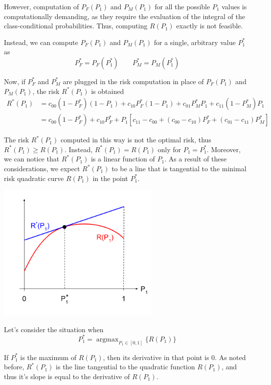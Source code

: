 \documentclass[oneside,onecolumn]{report}
\DeclareMathOperator*{\argmax}{argmax}
\begin{document}
However, computation of $P_F(P_1)$ and $P_M(P_1)$ for all the possible $P_1$ values is computationally demanding, as they require the evaluation of the integral of the class-conditional probabilities.
Thus, computing $R(P_1)$ exactly is not feasible.

Instead, we can compute $P_F(P_1)$ and $P_M(P_1)$ for a single, arbitrary value $P_1^*$ as
$$ P_F^* = P_F(P_1^*) \qquad P_M^* = P_M(P_1^*) $$

Now, if $P_F^*$ and $P_M^*$ are plugged in the risk computation in place of  $P_F(P_1)$ and $P_M(P_1)$, the risk $R^*(P_1)$ is obtained
\begin{align*}
    R^*(P_1)
    &= c_{00} (1 - P_F^*) (1 - P_1) +
    c_{10} P_F^* (1 - P_1) +
    c_{01} P_M^* P_1 +
    c_{11} (1 - P_M^*) P_1 \\
    &= c_{00} (1 - P_F^*) + c_{10} P_F^* + P_1 \left[ c_{11} - c_{00} + (c_{00} - c_{10}) P_F^* + (c_{01} - c_{11}) P_M^* \right]
\end{align*}

The risk $R^*(P_1)$ computed in this way is not the optimal risk, thus $R^*(P_1) \geq R(P_1)$.
Instead, $R^*(P_1) = R(P_1)$ only for $P_1 = P_1^*$.
Moreover, we can notice that $R^*(P_1)$ is a linear function of $P_1$.
As a result of these considerations, we expect $R^*(P_1)$ to be a line that is tangential to the minimal risk quadratic curve $R(P_1)$ in the point $P_1^*$.
\begin{center}
    \includegraphics[width=8cm]{approx_minimum_risk_vs_p1.png}
\end{center}

Let's consider the situation when
$$ P_1^* = \argmax_{P_1 \in[0, 1]}\{R(P_1)\} $$

If $P_1^*$ is the maximum of $R(P_1)$, then its derivative in that point is 0.
As noted before, $R^*(P_1)$ is the line tangential to the quadratic function $R(P_1)$, and thus it's slope is equal to the derivative of $R(P_1)$.
\end{document}
